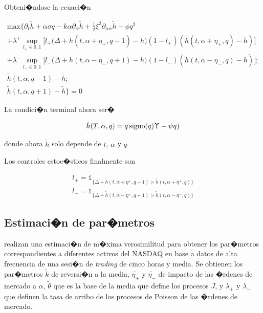 \documentclass[12pt,a4paper,spanish]{article}%
\begin{document}
Obteni�ndose la ecuaci�n

\begin{gather}
	\text{max} \bigg\{
	\partial_t \tilde{h}+\alpha\sigma q-k\alpha \partial_\alpha \tilde{h} + \frac{1}{2} \xi^2 \partial_{\alpha \alpha} \tilde{h} - \phi q^2 \nonumber \\
	+ \lambda^ + \sup_{l_+\in {0,1}} \bigg[l_+ \big(\Delta +  \tilde{h}(t,\alpha+\eta_+,q-1) - \tilde{h} \big) 
	(1-l_+) ( \tilde{h}(t,\alpha+\eta_+,q) - \tilde{h} )\bigg] \nonumber \\
	+ \lambda^ - \sup_{l_-\in {0,1}} \bigg[l_- \big(\Delta + \tilde{h}(t,\alpha-\eta_-,q+1) - \tilde{h} \big) 
	(1-l_-) ( \tilde{h}(t,\alpha-\eta_-,q) - \tilde{h} )\bigg]; \nonumber \\
	\tilde{h}(t,\alpha,q-1)-\tilde{h}; \nonumber \\
	\tilde{h}(t,\alpha,q+1)-\tilde{h}		 	
	\bigg\}=0
	\label{HJB_simple}	
\end{gather}


La condici�n terminal ahora ser�

\begin{equation}
	\tilde{h}(T,\alpha, q) = q \thinspace \text{signo}(q)\Upsilon - \psi q )
	\label{terminal_2}
\end{equation}

donde ahora $\tilde{h}$ solo depende de $t$, $\alpha$ y $q$.

Los controles estoc�sticos finalmente son

\begin{gather}
	\nonumber l_+ = \mathds{1}_{\{\Delta+\tilde{h}(t,\alpha+\eta^+,q-1)>\tilde{h}(t,\alpha+\eta^+,q)\}}\\
	l_-=\mathds{1}_{\{\Delta+\tilde{h}(t,\alpha-\eta^-,q+1)>\tilde{h}(t,\alpha-\eta^-,q)\}} 
	\label{l_2}
\end{gather}

\subsection{Estimaci�n de par�metros}
\cite{Cartea2019} realizan una estimaci�n de m�xima verosimilitud para obtener los par�metros correspondientes a diferentes activos del NASDAQ en base a datos de alta frecuencia de una sesi�n de \textit{trading} de cinco horas y media. Se obtienen los par�metros $\tilde{k}$ de reversi�n a la media, $\tilde{\eta_+}$ y $\tilde{\eta_-}$ de impacto de las �rdenes de mercado a $\alpha$, $\tilde{\theta}$ que es la base de la media que define los procesos $J$, y $\lambda_+$ y $\lambda_-$ que definen la tasa de arribo de los procesos de Poisson de las �rdenes de mercado.
\end{document}
